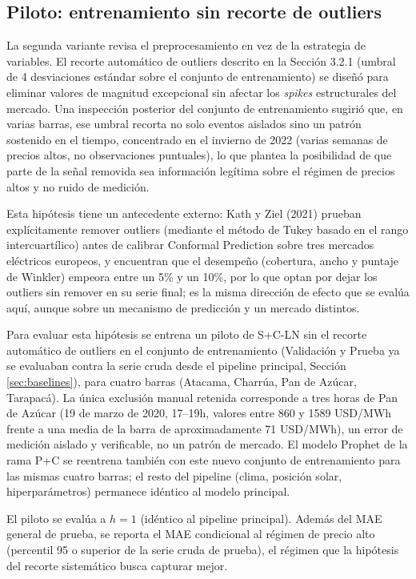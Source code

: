 \subsection{Piloto: entrenamiento sin recorte de outliers}
\label{sec:piloto_outliers_meta}

La segunda variante revisa el preprocesamiento en vez de la estrategia de variables. El recorte automático de outliers descrito en la Sección 3.2.1 (umbral de 4 desviaciones estándar sobre el conjunto de entrenamiento) se diseñó para eliminar valores de magnitud excepcional sin afectar los \textit{spikes} estructurales del mercado. Una inspección posterior del conjunto de entrenamiento sugirió que, en varias barras, ese umbral recorta no solo eventos aislados sino un patrón sostenido en el tiempo, concentrado en el invierno de 2022 (varias semanas de precios altos, no observaciones puntuales), lo que plantea la posibilidad de que parte de la señal removida sea información legítima sobre el régimen de precios altos y no ruido de medición.

Esta hipótesis tiene un antecedente externo: Kath y Ziel (2021) \cite{KathZiel2021} prueban explícitamente remover outliers (mediante el método de Tukey basado en el rango intercuartílico) antes de calibrar Conformal Prediction sobre tres mercados eléctricos europeos, y encuentran que el desempeño (cobertura, ancho y puntaje de Winkler) empeora entre un 5\% y un 10\%, por lo que optan por dejar los outliers sin remover en su serie final; es la misma dirección de efecto que se evalúa aquí, aunque sobre un mecanismo de predicción y un mercado distintos.

Para evaluar esta hipótesis se entrena un piloto de S+C-LN sin el recorte automático de outliers en el conjunto de entrenamiento (Validación y Prueba ya se evaluaban contra la serie cruda desde el pipeline principal, Sección \ref{sec:baselines}), para cuatro barras (Atacama, Charrúa, Pan de Azúcar, Tarapacá). La única exclusión manual retenida corresponde a tres horas de Pan de Azúcar (19 de marzo de 2020, 17--19h, valores entre 860 y 1589 USD/MWh frente a una media de la barra de aproximadamente 71 USD/MWh), un error de medición aislado y verificable, no un patrón de mercado. El modelo Prophet de la rama P+C se reentrena también con este nuevo conjunto de entrenamiento para las mismas cuatro barras; el resto del pipeline (clima, posición solar, hiperparámetros) permanece idéntico al modelo principal.

El piloto se evalúa a $h=1$ (idéntico al pipeline principal). Además del MAE general de prueba, se reporta el MAE condicional al régimen de precio alto (percentil 95 o superior de la serie cruda de prueba), el régimen que la hipótesis del recorte sistemático busca capturar mejor.

